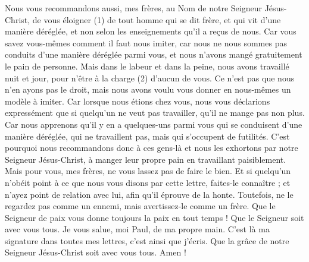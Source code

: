 \begin{multicols}{2}
Nous vous recommandons aussi, mes frères, au Nom de notre Seigneur Jésus-Christ, de vous éloigner (1) de tout homme qui se dit frère, et qui vit d’une manière déréglée, et non selon les enseignements qu'il a reçus de nous.
Car vous savez vous-mêmes comment il faut nous imiter, car nous ne nous sommes pas conduits d’une manière déréglée parmi vous,
et nous n'avons mangé gratuitement le pain de personne. Mais dans le labeur et dans la peine, nous avons travaillé nuit et jour, pour n’être à la charge (2) d’aucun de vous.
Ce n’est pas que nous n'en ayons pas le droit, mais nous avons voulu vous donner en nous-mêmes un modèle à imiter.
Car lorsque nous étions chez vous, nous vous déclarions expressément que si quelqu'un ne veut pas travailler, qu'il ne mange pas non plus.
Car nous apprenons qu'il y en a quelques-uns parmi vous qui se conduisent d'une manière déréglée, qui ne travaillent pas, mais qui s’occupent de futilités.
C’est pourquoi nous recommandons donc à ces gens-là et nous les exhortons par notre Seigneur Jésus-Christ, à manger leur propre pain en travaillant paisiblement.
Mais pour vous, mes frères, ne vous lassez pas de faire le bien.
Et si quelqu'un n'obéit point à ce que nous vous disons par cette lettre, faites-le connaître ; et n’ayez point de relation avec lui, afin qu’il éprouve de la honte.
Toutefois, ne le regardez pas comme un ennemi, mais avertissez-le comme un frère.
\TextTitle{[Conclusion]}
Que le Seigneur de paix vous donne toujours la paix en tout temps ! Que le Seigneur soit avec vous tous.
Je vous salue, moi Paul, de ma propre main. C’est là ma signature dans toutes mes lettres, c'est ainsi que j'écris.
Que la grâce de notre Seigneur Jésus-Christ soit avec vous tous. Amen !
\PPE{}
\end{multicols}
